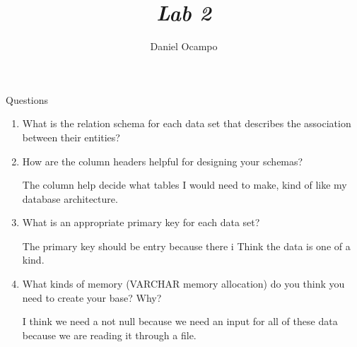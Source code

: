 \documentclass{report}
\title{\emph{ Lab 2  }}
\author{Daniel Ocampo}
\begin{document}
\maketitle 
\linespread{1.0}\selectfont




 Questions 

\begin{enumerate}
\item What is the relation schema for each data set that describes the association between their
entities?

\item How are the column headers helpful for designing your schemas?

The column help decide what tables I would need to make, kind of like my database architecture. 

\item What is an appropriate primary key for each data set?

The primary key should be entry because there i Think the data is one of a kind. 

\item What kinds of memory (VARCHAR memory allocation) do you think you need to create
your base? Why?

I think we need a not null because we need an input for all of these data because we are reading it through a file. 


\end{enumerate}
\end{document}
